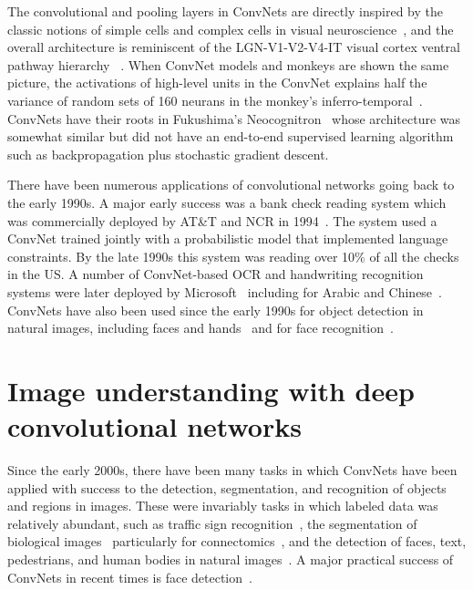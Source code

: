 \documentclass[10pts]{article}
\begin{document}
The convolutional and pooling layers in ConvNets are directly inspired
by the classic notions of simple cells and complex cells in visual
neuroscience~\citep{Hubel62}, and the overall architecture is
reminiscent of the LGN-V1-V2-V4-IT visual cortex ventral pathway
hierarchy ~\citep{Felleman+VanEssen-1991}. When ConvNet models and
monkeys are shown the same picture, the activations of high-level
units in the ConvNet explains half the variance of random sets of 160
neurans in the monkey's
inferro-temporal~\citep{cadieu-plos-2014}. ConvNets have their roots
in Fukushima's Neocognitron~\citep{fukushima-82} whose architecture
was somewhat similar but did not have an end-to-end supervised
learning algorithm such as backpropagation plus stochastic gradient
descent.

There have been numerous applications of convolutional networks going
back to the early 1990s. A major early success was a bank check
reading system which was commercially deployed by AT\&T and NCR in
1994~\citep{lecun-98}. The system used a ConvNet trained jointly with
a probabilistic model that implemented language constraints. By the
late 1990s this system was reading over 10\% of all the checks in the
US. A number of ConvNet-based OCR and handwriting recognition systems
were later deployed by
Microsoft~\citep{simard-03,chellapilla-ist-06,chellapilla-iwfhr-06b}
including for Arabic and
Chinese~\citep{abdulkader-iwfhr-06,chellapilla-iwfhr-06a}. ConvNets
have also been used since the early 1990s for object detection in
natural images, including faces and
hands~\cite{vaillant-monrocq-lecun-94,nowlan-platt-95} and for face
recognition~\cite{lawrence-tnn-1997}.


\section{Image understanding with deep convolutional networks}

Since the early 2000s, there have been many tasks in which ConvNets
have been applied with success to the detection, segmentation, and
recognition of objects and regions in images. These were invariably
tasks in which labeled data was relatively abundant, such as traffic
sign recognition~\cite{sermanet-ijcnn-11,Ciresan-et-al-2012}, the
segmentation of biological images~\cite{ning-05} particularly for
connectomics~\cite{Turaga2010}, and the detection of faces, text,
pedestrians, and human bodies in natural
images~\cite{vaillant-monrocq-lecun-94,nowlan-platt-95,garcia-delakis-04,osadchy-07,
  nasse-09,fan-pami-2010,Jain-et-al-arxiv2013,sermanet-cvpr-13,Tompson-et-al-arxiv2014}.
A major practical success of ConvNets in recent times is face
detection~\citep{taigman-cvpr-2014}.
\end{document}
